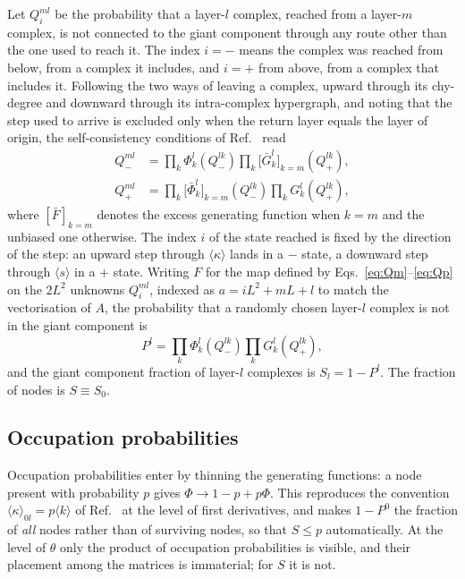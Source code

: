 \documentclass[aps,pre,twocolumn,superscriptaddress,floatfix,longbibliography]{revtex4-2}
\newcommand{\ave}[1]{\langle #1 \rangle}
\begin{document}
Let $Q^{ml}_i$ be the probability that a layer-$l$ complex, reached from a
layer-$m$ complex, is not connected to the giant component through any route
other than the one used to reach it. The index $i=-$ means the complex was
reached from below, from a complex it includes, and $i=+$ from above, from a
complex that includes it. Following the two ways of leaving a complex, upward
through its chy-degree and downward through its intra-complex hypergraph, and
noting that the step used to arrive is excluded only when the return layer
equals the layer of origin, the self-consistency conditions of
Ref.~\cite{vazquez2023pre} read
\begin{align}
  Q^{ml}_- &= \prod_k \Phi^l_k\!\left(Q^{lk}_-\right)
              \prod_k \Big[\bar G^l_k\Big]_{k=m}\!\!\left(Q^{lk}_+\right),
  \label{eq:Qm}\\
  Q^{ml}_+ &= \prod_k \Big[\bar\Phi^l_k\Big]_{k=m}\!\!\left(Q^{lk}_-\right)
              \prod_k G^l_k\!\left(Q^{lk}_+\right),
  \label{eq:Qp}
\end{align}
where $[\bar F]_{k=m}$ denotes the excess generating function when $k=m$ and the
unbiased one otherwise. The index $i$ of the state reached is fixed by the
direction of the step: an upward step through $\ave{\kappa}$ lands in a
$-$ state, a downward step through $\ave{s}$ in a $+$ state. Writing $F$ for
the map defined by Eqs.~\eqref{eq:Qm}--\eqref{eq:Qp} on the $2L^2$ unknowns
$Q^{ml}_i$, indexed as $a=iL^2+mL+l$ to match the vectorisation of $A$, the
probability that a randomly chosen layer-$l$ complex is not in the giant
component is
\begin{equation}
  P^l = \prod_k \Phi^l_k\!\left(Q^{lk}_-\right)\prod_k G^l_k\!\left(Q^{lk}_+\right),
  \label{eq:P}
\end{equation}
and the giant component fraction of layer-$l$ complexes is $S_l=1-P^l$. The
fraction of nodes is $S\equiv S_0$.

\subsection{Occupation probabilities}

Occupation probabilities enter by thinning the generating functions: a node
present with probability $p$ gives $\Phi\to1-p+p\Phi$. This reproduces the
convention $\ave{\kappa}_{0l}=p\ave{k}$ of Ref.~\cite{vazquez2024comnet} at the
level of first derivatives, and makes $1-P^0$ the fraction of \emph{all} nodes
rather than of surviving nodes, so that $S\le p$ automatically. At the level of
$\theta$ only the product of occupation probabilities is visible, and their
placement among the matrices is immaterial; for $S$ it is not.
\end{document}
